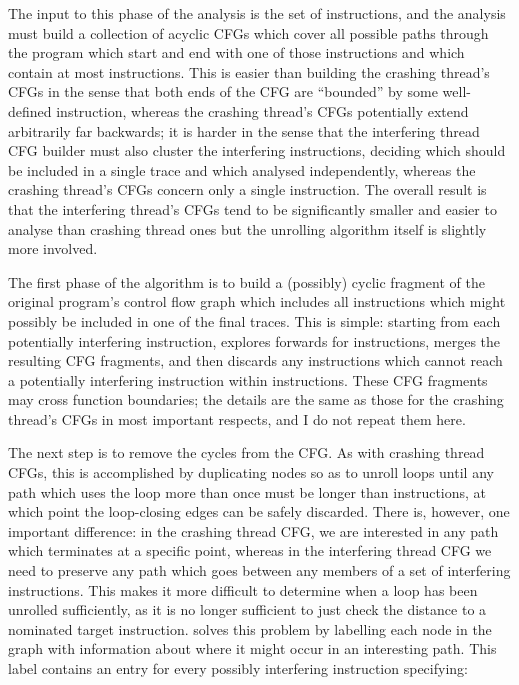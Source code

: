 The input to this phase of the analysis is the set of
 instructions, and the analysis must build
a collection of acyclic CFGs which cover all possible paths through
the program which start and end with one of those instructions and
which contain at most \backref{$\alpha$} instructions.  This is easier
than building the crashing thread's CFGs in the sense that both ends
of the CFG are ``bounded'' by some well-defined instruction, whereas
the crashing thread's CFGs potentially extend arbitrarily far
backwards; it is harder in the sense that the interfering thread CFG
builder must also cluster the interfering instructions, deciding which
should be included in a single trace and which analysed independently,
whereas the crashing thread's CFGs concern only a single instruction.
The overall result is that the interfering thread's CFGs tend to be
significantly smaller and easier to analyse than crashing thread ones
but the unrolling algorithm itself is slightly more involved.

The first phase of the algorithm is to build a (possibly) cyclic
fragment of the original program's control flow graph which includes
all instructions which might possibly be included in one of the final
traces.  This is simple: starting from each potentially interfering
instruction, {\technique} explores forwards for \backref{$\alpha$}
instructions, merges the resulting CFG fragments, and then discards
any instructions which cannot reach a potentially interfering
instruction within \backref{$\alpha$} instructions.  These CFG
fragments may cross function boundaries; the details are the same as
those for the crashing thread's CFGs in most important respects, and I
do not repeat them here.

The next step is to remove the cycles from the CFG.  As with crashing
thread CFGs, this is accomplished by duplicating nodes so as to unroll
loops until any path which uses the loop more than once must be longer
than \backref{$\alpha$} instructions, at which point the loop-closing
edges can be safely discarded.  There is, however, one important
difference: in the crashing thread CFG, we are interested in any path
which terminates at a specific point, whereas in the interfering
thread CFG we need to preserve any path which goes between any members
of a set of interfering instructions.  This makes it more difficult to
determine when a loop has been unrolled sufficiently, as it is no
longer sufficient to just check the distance to a nominated target
instruction.  {\Technique} solves this problem by labelling each node
in the graph with information about where it might occur in an
interesting path.  This label contains an entry for every possibly
interfering instruction specifying:

